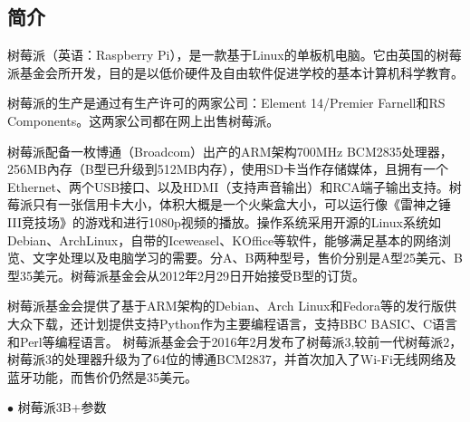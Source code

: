 		\subsection{简介}
			\par 树莓派（英语：Raspberry Pi），是一款基于Linux的单板机电脑。它由英国的树莓派基金会所开发，目的是以低价硬件及自由软件促进学校的基本计算机科学教育。
			\par 树莓派的生产是通过有生产许可的两家公司：Element 14/Premier Farnell和RS Components。这两家公司都在网上出售树莓派。
			\par 树莓派配备一枚博通（Broadcom）出产的ARM架构700MHz BCM2835处理器，256MB內存（B型已升级到512MB内存），使用SD卡当作存储媒体，且拥有一个Ethernet、两个USB接口、以及HDMI（支持声音输出）和RCA端子输出支持。树莓派只有一张信用卡大小，体积大概是一个火柴盒大小，可以运行像《雷神之锤III竞技场》的游戏和进行1080p视频的播放。操作系统采用开源的Linux系统如Debian、ArchLinux，自带的Iceweasel、KOffice等软件，能够满足基本的网络浏览、文字处理以及电脑学习的需要。分A、B两种型号，售价分别是A型25美元、B型35美元。树莓派基金会从2012年2月29日开始接受B型的订货。
			\par 树莓派基金会提供了基于ARM架构的Debian、Arch Linux和Fedora等的发行版供大众下载，还计划提供支持Python作为主要编程语言，支持BBC BASIC、C语言和Perl等编程语言。
			树莓派基金会于2016年2月发布了树莓派3,较前一代树莓派2，树莓派3的处理器升级为了64位的博通BCM2837，并首次加入了Wi-Fi无线网络及蓝牙功能，而售价仍然是35美元。\cite{ wiki:树莓派}
			\par\noindent $\bullet$ 树莓派3B+参数
